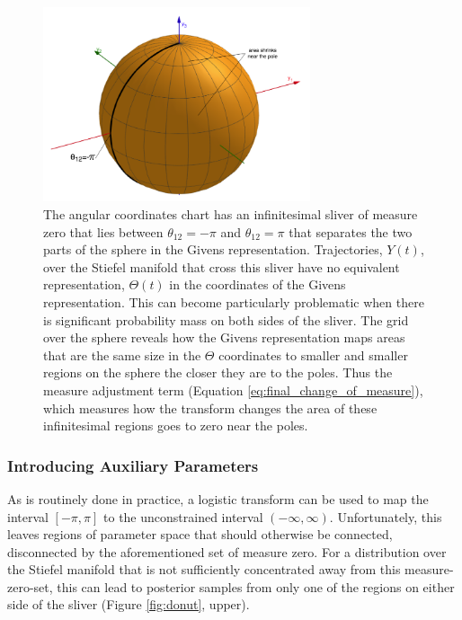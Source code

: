 \documentclass[ba]{imsart}
\numberwithin{equation}{section}
\theoremstyle{plain}
\begin{document}
\begin{figure}[h]
\centering
\vspace{.1in}
\includegraphics[width=0.7\textwidth]{figures/sliver_globe.png}
\vspace{.05in}
\caption{The angular coordinates chart has an infinitesimal sliver of measure zero that lies between $\theta_{12} = -\pi$ and $\theta_{12} = \pi$ that separates the two parts of the sphere in the Givens representation. Trajectories, $Y(t)$, over the Stiefel manifold that cross this sliver have no equivalent representation, $\Theta(t)$ in the coordinates of the Givens representation. This can become particularly problematic when there is significant probability mass on both sides of the sliver. The grid over the sphere reveals how the Givens representation maps areas that are the same size in the $\Theta$ coordinates to smaller and smaller regions on the sphere the closer they are to the poles. Thus the measure adjustment term (Equation \ref{eq:final_change_of_measure}), which measures how the transform changes the area of these infinitesimal regions goes to zero near the poles.}
\label{fig:pathologies}
\end{figure}

\subsubsection{Introducing Auxiliary Parameters}
\noindent As is routinely done in practice, a logistic transform can be used to map the interval $[-\pi,\pi]$ to the unconstrained interval $(-\infty, \infty)$. Unfortunately, this leaves regions of parameter space that should otherwise be connected, disconnected by the aforementioned set of measure zero. For a distribution over the Stiefel manifold that is not sufficiently concentrated away from this measure-zero-set, this can lead to posterior samples from only one of the regions on either side of the sliver (Figure \ref{fig:donut}, upper).
\end{document}
